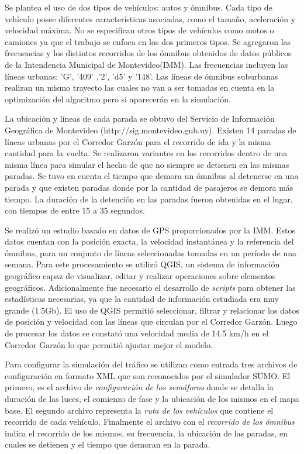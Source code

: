 Se plantea el uso de dos tipos de vehículos: autos y ómnibus. Cada tipo de vehículo posee diferentes características asociadas, como el tamaño, aceleración y velocidad máxima. No se especifican otros tipos de vehículos como motos o camiones ya que el trabajo se enfoca en los dos primeros tipos. Se agregaron las frecuencias y los distintos recorridos de los ómnibus obtenidos de datos públicos de la Intendencia Municipal de Montevideo(IMM). Las frecuencias incluyen las líneas urbanas: 'G', '409' ,'2', 'd5'  y  '148'. Las líneas de ómnibus suburbanas realizan  un mismo  trayecto las cuales no van a ser tomadas en cuenta en la optimización del algoritmo pero si aparecerán en la simulación.

La ubicación y líneas de cada parada se obtuvo del Servicio de Información Geográfica de Montevideo (http://sig.montevideo.gub.uy). Existen 14 paradas de líneas urbanas por el Corredor Garzón para el recorrido de ida y la misma cantidad para la vuelta. Se realizaron variantes en los recorridos dentro de una misma línea para simular el hecho de que no siempre se detienen en las mismas paradas. Se tuvo en cuenta el tiempo que demora un ómnibus al detenerse en una parada y que existen paradas donde por la cantidad de pasajeros se demora más tiempo. La duración de la detención en las paradas fueron obtenidas en el lugar, con tiempos de entre 15 a 35 segundos.

Se realizó un estudio basado en datos de GPS proporcionados por la IMM. Estos datos cuentan con la posición exacta, la velocidad instantánea y la referencia del ómnibus, para un conjunto de líneas seleccionadas tomadas en un período de una semana. 
Para este procesamiento se utilizó QGIS, un sistema de información geográfico capaz de visualizar, editar y realizar operaciones sobre elementos geográficos. Adicionalmente fue necesario el desarrollo de \emph{scripts} para obtener las estadísticas necesarias, ya que la cantidad de información estudiada era muy grande (1.5Gb). El uso de QGIS permitió seleccionar, filtrar y relacionar los datos de posición y velocidad con las líneas que circulan por el Corredor Garzón. Luego de procesar los datos se constató una velocidad media de 14.5 km/h en el Corredor Garzón lo que permitió ajustar mejor el modelo. 

Para configurar la simulación del tráfico se utilizan como entrada tres archivos de configuración en formato XML que son reconocidos por el simulador SUMO. El primero, es el archivo de \emph{configuración de los semáforos} donde se detalla la duración de las luces, el comienzo de fase y la ubicación de los mismos en el mapa base. El segundo archivo representa la \emph{ruta de los vehículos} que contiene el recorrido de cada vehículo. Finalmente el archivo con el \emph{recorrido de los ómnibus} indica el recorrido de los mismos, su frecuencia, la ubicación de las paradas, en cuales se detienen y el tiempo que demoran en la parada.

